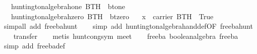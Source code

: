 \begin{isabellebody}
\ \ \ {}huntington{}algebra{}hone\ BTH\ {}\ bt{}one{}\isanewline
\ \ \ {}huntington{}algebra{}hzero\ BTH\ {}\ bt{}zero{}\isanewline
\ \ \ {}x\ {}\ carrier\ BTH\ {}\ True{}\isanewline
%
\isadelimproof
\ \ %
\endisadelimproof
%
\isatagproof
{}\isamarkupfalse%
\ {}simp{}all\ add{}\ free{}ba{}hunt{}\isanewline
\ \ \isamarkupfalse%
\ {}simp\ add{}\ huntington{}algebra{}hand{}def{}OF\ free{}ba{}hunt{}{}\isanewline
\ \ \isamarkupfalse%
\ transfer\isanewline
\ \ \isamarkupfalse%
\ {}metis\ hunt{}cong{}sym\ meet{}\isanewline
\ \ \isamarkupfalse%
%
\endisatagproof
{\isafoldproof}%
%
\isadelimproof
\isanewline
%
\endisadelimproof
\isanewline
{}\isamarkupfalse%
\ free{}ba{}\ {}boolean{}algebra\ free{}ba{}\isanewline
%
\isadelimproof
%
\endisadelimproof
%
\isatagproof
{}\isamarkupfalse%
\ {}simp\ add{}\ free{}ba{}def{}\isanewline

\end{isabellebody}
